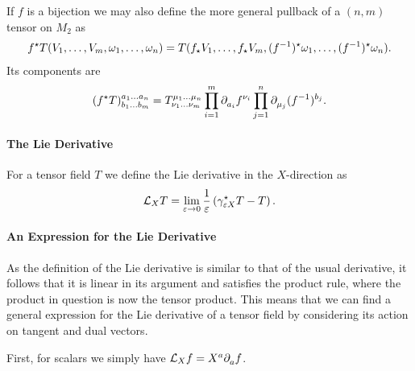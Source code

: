 If $f$ is a bijection we may also define the more general pullback of a $(n, m)$ tensor on $M_{2}$ as
\begin{align*}
	f^{\star}T(V_{1}, \dots, V_{m}, \omega_{1}, \dots, \omega_{n}) = T(f_{\star}V_{1}, \dots, f_{\star}V_{m}, (f^{-1})^{\star}\omega_{1}, \dots, (f^{-1})^{\star}\omega_{n}).
\end{align*}
Its components are
\begin{align*}
	\tensor*{(\pub{f}{T})}{^{a_{1}\dots a_{n}}_{b_{1}\dots b_{m}}} = T^{\mu_{1}\dots \mu_{n}}_{\nu_{1}\dots\nu_{m}}\prod\limits_{i = 1}^{m}\del{}{a_{i}}f^{\nu_{i}}\prod\limits_{j = 1}^{n}\del{}{\mu_{j}}(f^{-1})^{b_{j}}.
\end{align*}

\paragraph{The Lie Derivative}
For a tensor field $T$ we define the Lie derivative in the $X$-direction as
\begin{align*}
	\mathcal{L}_{X}T = \lim\limits_{\varepsilon\to 0}\frac{1}{\varepsilon}\left(\gamma_{\varepsilon X}^{\star}T - T\right).
\end{align*}

\paragraph{An Expression for the Lie Derivative}
As the definition of the Lie derivative is similar to that of the usual derivative, it follows that it is linear in its argument and satisfies the product rule, where the product in question is now the tensor product. This means that we can find a general expression for the Lie derivative of a tensor field by considering its action on tangent and dual vectors.

First, for scalars we simply have $\mathcal{L}_{X}f = X^{a}\partial^{}_{a}{f}$.

